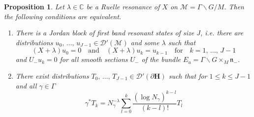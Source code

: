 \documentclass[10pt]{amsart}
\newtheorem{prop}[cdrthm]{Proposition}
\theoremstyle{definition}
\newcommand{\mc}{\mathcal}
\newcommand{\cc}{\mathbb{C}}
\newcommand{\bfh}{\mathbf{H}}
\newcommand{\la}{\lambda}
\newcommand{\pl}{\partial}
\newcommand{\n}{\mathfrak n}
\begin{document}
\begin{prop}\label{prop:ruell_jordan_bv}
Let $\lambda\in \cc$ be a Ruelle resonance of $X$ on $\mc{M}=\Gamma\backslash G/M$. Then the following conditions are equivalent.
\begin{enumerate}
\item \label{list3.9.1}There is a Jordan block of first band resonant states of size $J$, i.e. there are distributions $u_0,\,\ldots,\,u_{J-1} \in \mc{D}'(\mc{M})$ and some $\la$ such that
\begin{equation}\label{relationJB}
(X+\lambda)u_0 = 0\quad\text{and}\quad(X + \lambda)u_k = u_{k-1}\quad\text{for}\quad k=1,\,\ldots,\,J-1
\end{equation}
and $U_- u_k=0$ for all smooth sections $U_-$ of the bundle $E_u=\Gamma\backslash G\times_M \n_-$.
\item \label{list3.9.2}There exist distributions $T_0,\,\ldots,\,T_{J-1}\in \mathcal D'(\pl{\bfh})$ such that for $1\leq k\leq J-1$ and all $\gamma\in \Gamma$
\begin{equation}\label{eq:T_k_transformation}
\gamma^* T_k = N_\gamma^{-\lambda}\sum_{l=0}^k\frac{(\log N_\gamma)^{k-l}}{(k-l)!}T_{l}
\end{equation}
\end{enumerate}
\end{prop}
\end{document}
